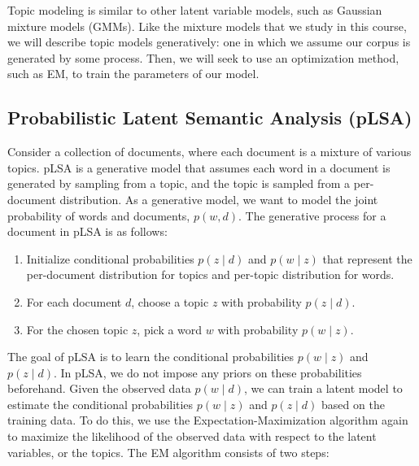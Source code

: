 \documentclass[12pt,letterpaper]{article}
\begin{document}
Topic modeling is similar to other latent variable models, such as Gaussian mixture models (GMMs).
Like the mixture models that we study in this course, we will describe topic models generatively: one in which we assume our corpus is generated
by some process. Then, we will seek to use an optimization method, such as EM, to train the parameters of our model.

\subsection{Probabilistic Latent Semantic Analysis (pLSA)}

Consider a collection of documents, where each document is a mixture of various topics. pLSA is a generative model that assumes each word in a document is generated by sampling from a topic, and the topic is sampled from a per-document distribution. As a generative model, we want to model the joint probability of words and documents, $p(w, d)$. The generative process for a document in pLSA is as follows:
\begin{enumerate}
    \item Initialize conditional probabilities $p(z \mid d)$ and $p(w\mid z)$ that represent the per-document distribution for topics and per-topic distribution for words.
    \item For each document $d$, choose a topic $z$ with probability $p(z \mid d)$.
    \item For the chosen topic $z$, pick a word $w$ with probability $p(w \mid z)$.
\end{enumerate}

The goal of pLSA is to learn the conditional probabilities $p(w \mid z)$ and $p(z \mid d)$. In pLSA, we do not impose any priors on these probabilities beforehand. Given the observed data $p(w \mid d)$, we can train a latent model to estimate the conditional probabilities $p(w \mid z)$ and $p(z \mid d)$ based on the training data. To do this, we use the Expectation-Maximization algorithm again to maximize the likelihood of the observed data with respect to the latent variables, or the topics. The EM algorithm consists of two steps:
\end{document}
